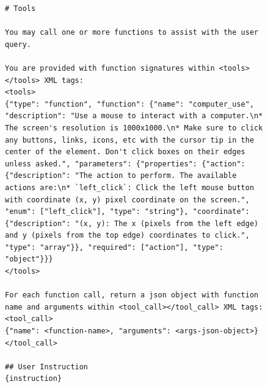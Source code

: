 \begin{figure}[t]
\begin{tcolorbox}[colback=white, width=\linewidth, breakable, enhanced, 
                  title=Prompt for the GUI-Owl-1.5 Model, fonttitle=\bfseries, label=prompt:guiowl15]

\lstset{
basicstyle=\scriptsize\ttfamily,
    columns=fullflexible,
    breaklines=true,
    breakatwhitespace=false,
    showstringspaces=false,
    lineskip=-1pt
}

\begin{lstlisting}
# Tools

You may call one or more functions to assist with the user query.

You are provided with function signatures within <tools></tools> XML tags:
<tools>
{"type": "function", "function": {"name": "computer_use", "description": "Use a mouse to interact with a computer.\n* The screen's resolution is 1000x1000.\n* Make sure to click any buttons, links, icons, etc with the cursor tip in the center of the element. Don't click boxes on their edges unless asked.", "parameters": {"properties": {"action": {"description": "The action to perform. The available actions are:\n* `left_click`: Click the left mouse button with coordinate (x, y) pixel coordinate on the screen.", "enum": ["left_click"], "type": "string"}, "coordinate": {"description": "(x, y): The x (pixels from the left edge) and y (pixels from the top edge) coordinates to click.", "type": "array"}}, "required": ["action"], "type": "object"}}}
</tools>

For each function call, return a json object with function name and arguments within <tool_call></tool_call> XML tags:
<tool_call>
{"name": <function-name>, "arguments": <args-json-object>}
</tool_call>

## User Instruction
{instruction}

\end{lstlisting}

\end{tcolorbox}
\end{figure}